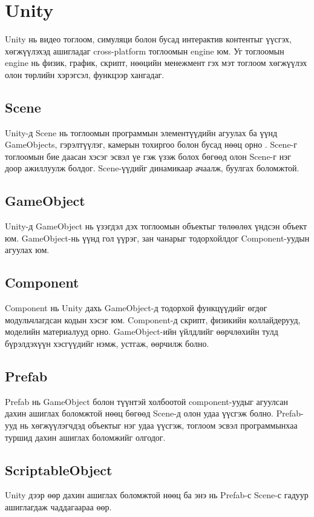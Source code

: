 \section{Unity}
Unity нь видео тоглоом, симуляци болон бусад интерактив контентыг үүсгэх, хөгжүүлэхэд ашигладаг cross-platform тоглоомын engine юм. Уг тоглоомын engine нь физик, график, скрипт, нөөцийн менежмент гэх мэт тоглоом хөгжүүлэх олон төрлийн хэрэгсэл, функцээр хангадаг.
\subsection{Scene}
Unity-д Scene нь тоглоомын программын элементүүдийн агуулах ба үүнд GameObjects, гэрэлтүүлэг, камерын тохиргоо болон бусад нөөц орно . Scene-г тоглоомын бие даасан хэсэг эсвэл үе гэж үзэж болох бөгөөд олон Scene-г нэг доор ажиллуулж болдог. Scene-үүдийг динамикаар ачаалж, буулгах боломжтой.
\subsection{GameObject}
Unity-д GameObject нь үзэгдэл дэх тоглоомын объектыг төлөөлөх үндсэн объект юм. GameObject-нь үүнд гол үүрэг, зан чанарыг тодорхойлдог Component-уудын агуулах юм.
\subsection{Component}
Component нь Unity дахь GameObject-д тодорхой функцүүдийг өгдөг модульчлагдсан кодын хэсэг юм. Component-д скрипт, физикийн коллайдерууд, моделийн материалууд орно. GameObject-ийн үйлдлийг өөрчлөхийн тулд бүрэлдэхүүн хэсгүүдийг нэмж, устгаж, өөрчилж болно.
\subsection{Prefab}
Prefab нь GameObject болон түүнтэй холбоотой component-уудыг агуулсан дахин ашиглах боломжтой нөөц бөгөөд Scene-д олон удаа үүсгэж болно. Prefab-ууд нь хөгжүүлэгчдэд объектыг нэг удаа  үүсгэж, тоглоом эсвэл программынхаа туршид дахин ашиглах боломжийг олгодог.
\subsection{ScriptableObject}
Unity дээр өөр дахин ашиглах боломжтой нөөц ба энэ нь Prefab-с Scene-с гадуур ашиглагдаж чаддагаараа өөр.
